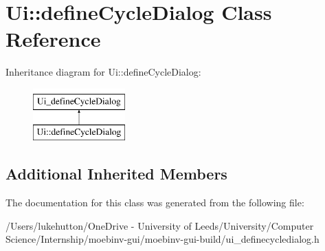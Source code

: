 \hypertarget{class_ui_1_1define_cycle_dialog}{}\section{Ui\+:\+:define\+Cycle\+Dialog Class Reference}
\label{class_ui_1_1define_cycle_dialog}
Inheritance diagram for Ui\+:\+:define\+Cycle\+Dialog\+:\begin{figure}[H]
\begin{center}
\leavevmode
\includegraphics[height=2.000000cm]{class_ui_1_1define_cycle_dialog}
\end{center}
\end{figure}
\subsection*{Additional Inherited Members}


The documentation for this class was generated from the following file\+:\begin{DoxyCompactItemize}
\item 
/\+Users/lukehutton/\+One\+Drive -\/ University of Leeds/\+University/\+Computer Science/\+Internship/moebinv-\/gui/moebinv-\/gui-\/build/ui\+\_\+definecycledialog.\+h\end{DoxyCompactItemize}
